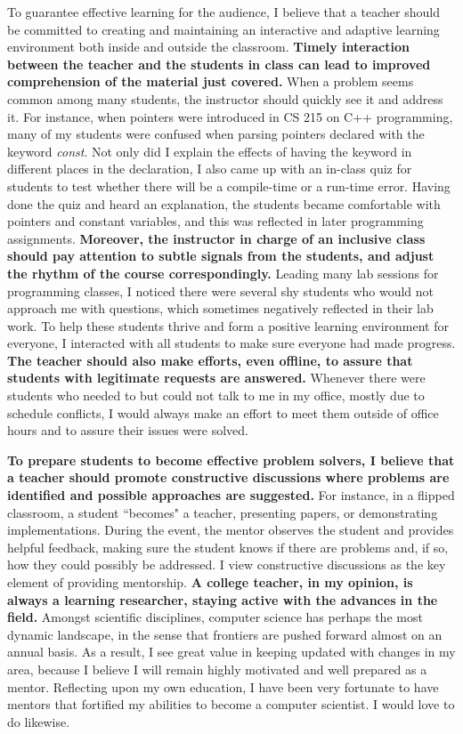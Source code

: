 \documentclass[12pt]{article}
\newcommand{\tit}[1]{\textit{#1}}
\newcommand{\tbf}[1]{\textbf{#1}}
\begin{document}
To guarantee effective learning for the audience, 
I believe that a teacher should be committed to
creating and maintaining an interactive and adaptive learning environment both inside
and outside the classroom.
\tbf{Timely interaction between the teacher and the students in class can lead to improved
comprehension of the material just covered.}
When a problem seems common among many students, the instructor should quickly
see it and address it.
For instance, when pointers were introduced in CS 215 on C++ programming, 
many of my students were confused when parsing pointers declared with the keyword \tit{const}.
Not only did I explain the effects of having the keyword in different places in the
declaration, I also came up with an in-class quiz for students to test whether there
will be a compile-time or a run-time error.
Having done the quiz and heard an explanation, the students became comfortable with
pointers and constant variables, and this was reflected in later programming assignments.
\tbf{Moreover, the instructor in charge of an inclusive class should
pay attention to subtle signals from the students, 
and adjust the rhythm of the course correspondingly.}
Leading many lab sessions for programming classes,
I noticed there were several shy students who would not approach me with questions,
which sometimes negatively reflected in their lab work.
To help these students thrive and form a positive learning environment for everyone, 
I interacted with all students to make sure everyone had made progress.
\tbf{The teacher should also make efforts, even offline, 
to assure that students with legitimate requests are answered.}
Whenever there were students who needed to but could not
talk to me in my office, mostly due to schedule conflicts, 
I would always make an effort to meet them outside of office hours and
to assure their issues were solved.

\tbf{To prepare students to become effective problem solvers, 
I believe that a teacher should promote
constructive discussions where problems are identified and possible approaches are suggested.}
For instance, in a flipped classroom, a student ``becomes" a teacher, presenting papers,
or demonstrating implementations.  During the event, the mentor observes the student and
provides helpful feedback, making sure the student knows if there are problems and, if so,
how they could possibly be addressed.
I view constructive discussions as the key element of providing mentorship.
\tbf{A college teacher, in my opinion, is always a learning researcher, staying
active with the advances in the field.}
Amongst scientific disciplines,
computer science has perhaps the most dynamic landscape, in the sense that
frontiers are pushed forward almost on an annual basis.
As a result, I see great value in keeping updated with changes in my area,
because I believe I will remain highly motivated and well prepared as a mentor.
Reflecting upon my own education, I have been very fortunate to have mentors
that fortified my abilities to become a computer scientist.
I would love to do likewise.
\end{document}
